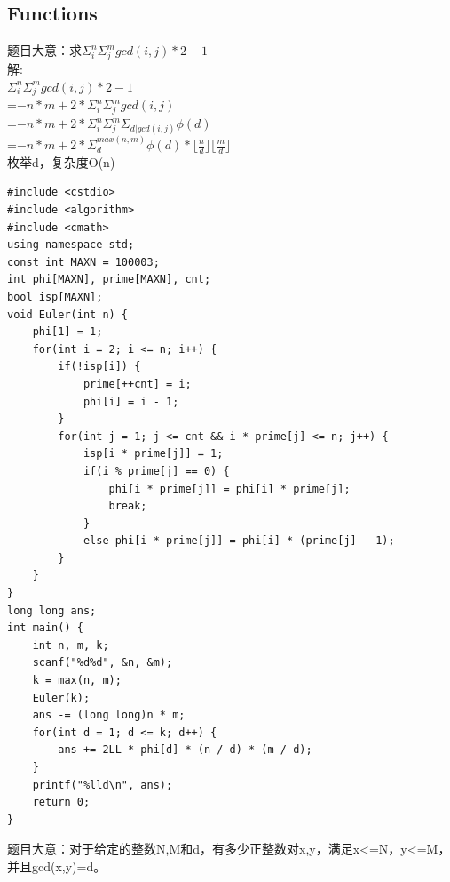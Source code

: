 \documentclass[10pt]{ctexart}
\begin{document}
{\subsection{Functions}
题目大意：求$\Sigma_i^n\Sigma_j^mgcd(i, j) * 2 - 1$\\

解:\\
$\Sigma_i^n\Sigma_j^mgcd(i, j) * 2 - 1$\\
=$- n * m + 2 * \Sigma_i^n\Sigma_j^mgcd(i, j) $\\
=$- n * m + 2 * \Sigma_i^n\Sigma_j^m\Sigma_{d|gcd(i, j)} \phi(d) $\\
=$-n * m + 2 * \Sigma_d^{max(n, m)}\phi(d) * \lfloor\frac{n}{d}\rfloor\lfloor\frac{m}{d}\rfloor $\\枚举d，复杂度O(n)
\begin{lstlisting}
#include <cstdio>
#include <algorithm>
#include <cmath>
using namespace std;
const int MAXN = 100003;
int phi[MAXN], prime[MAXN], cnt;
bool isp[MAXN];
void Euler(int n) {
    phi[1] = 1;
    for(int i = 2; i <= n; i++) {
        if(!isp[i]) {
            prime[++cnt] = i;
            phi[i] = i - 1;
        }
        for(int j = 1; j <= cnt && i * prime[j] <= n; j++) {
            isp[i * prime[j]] = 1;
            if(i % prime[j] == 0) {
                phi[i * prime[j]] = phi[i] * prime[j];
                break;
            }
            else phi[i * prime[j]] = phi[i] * (prime[j] - 1);
        }
    }
}
long long ans;
int main() {
    int n, m, k;
    scanf("%d%d", &n, &m);
    k = max(n, m);
    Euler(k);
    ans -= (long long)n * m;
    for(int d = 1; d <= k; d++) {
        ans += 2LL * phi[d] * (n / d) * (m / d);
    }
    printf("%lld\n", ans);
    return 0;
}
\end{lstlisting}

题目大意：对于给定的整数N,M和d，有多少正整数对x,y，满足x<=N，y<=M，并且gcd(x,y)=d。\\

}
\end{document}
